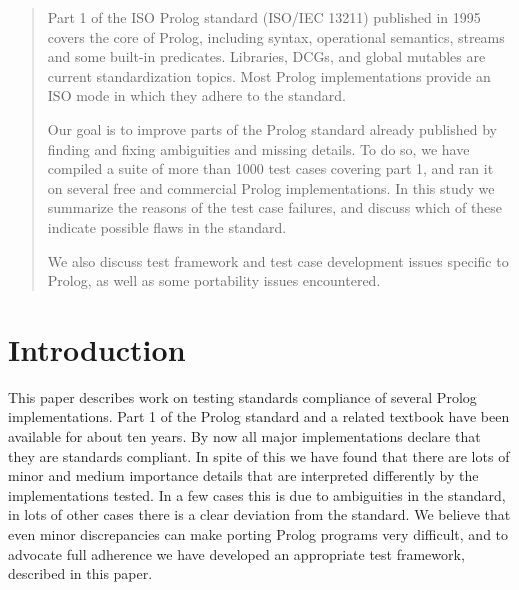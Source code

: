 \documentclass[draft]{llncs}%
\begin{document}
\begin{abstract}

\ifdim\parindent=0pt \parindent1em \fi



Part 1 of the ISO Prolog standard (ISO/IEC 13211) published in 1995 covers
the  core of Prolog, including syntax, operational semantics,
streams and some built-in predicates. Libraries, DCGs, and global
mutables are current standardization topics. Most Prolog implementations
provide an ISO mode in which they adhere to the standard.

Our goal is to improve parts of the Prolog standard already published by
finding and fixing ambiguities and missing details. To do so, we have
compiled a suite of more than 1000 test cases covering part 1, and ran it
on several free and commercial Prolog implementations. In this study we
summarize the reasons of the test case failures, and discuss which of these
indicate possible flaws in the standard.

We also discuss test framework and test case development issues specific to
Prolog, as well as some portability issues encountered.

\end{abstract}

\section{Introduction}


This paper describes work on testing standards compliance of several Prolog
implementations. Part 1 of the Prolog standard \cite{isoprolog95} and a
related textbook \cite{isoprologbook} have been available for about ten
years. By now all major implementations declare that they are standards
compliant. In spite of this we have found that there are lots of minor and
medium importance details that are interpreted differently by the
implementations tested. In a few cases this is due to ambiguities in the
standard, in lots of other cases there is a clear deviation from the
standard. We believe that even minor discrepancies can make porting Prolog
programs very difficult, and to advocate full adherence we have developed an
appropriate test framework, described in this paper.
\end{document}
